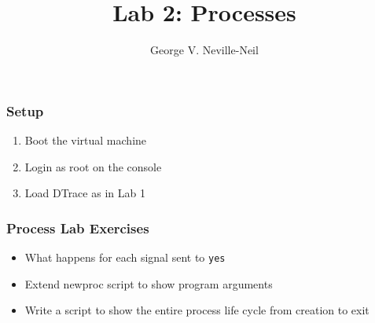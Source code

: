 \documentclass[pdftex]{beamer}
\begin{document}

\title{Lab 2: Processes}
\author[shortname]{George V. Neville-Neil}

\begin{frame}
  \frametitle{Setup}
  \begin{enumerate}
  \item Boot the virtual machine
  \item Login as root on the console
  \item Load DTrace as in Lab 1
  \end{enumerate}
\end{frame}

\begin{frame}[fragile]
  \frametitle{Process Lab Exercises}
  \begin{itemize}
  \item What happens for each signal sent to \verb+yes+
  \item Extend newproc script to show program arguments
  \item Write a script to show the entire process life cycle from creation
    to exit
  \end{itemize}
\end{frame}
\end{document}
